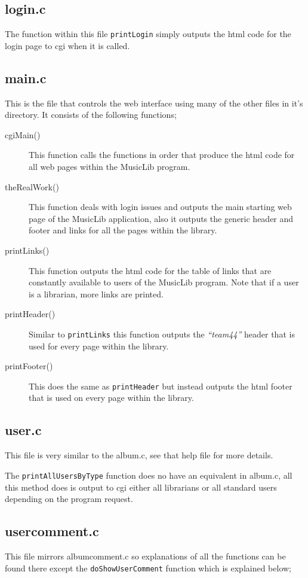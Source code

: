 \documentclass{article}
\begin{document}
\subsection{login.c}
The function within this file \verb|printLogin| simply outputs the html code for the login page to cgi when it is called.

\subsection{main.c}
This is the file that controls the web interface using many of the other files in it's directory. It consists of the following functions;
\begin{description}
\item[cgiMain()] This function calls the functions in order that produce the html code for all web pages within the MusicLib program.
\item[theRealWork()] This function deals with login issues and outputs the main starting web page of the MusicLib application, also it outputs the generic header and footer and links for all the pages within the library.
\item[printLinks()] This function outputs the html code for the table of links that are constantly available to users of the MusicLib program. Note that if a user is a librarian, more links are printed.
\item[printHeader()] Similar to \verb|printLinks| this function outputs the \emph{``team44''} header that is used for every page within the library.
\item[printFooter()] This does the same as \verb|printHeader| but instead outputs the html footer that is used on every page within the library.
\end{description}

\subsection{user.c}
This file is very similar to the album.c, see that help file for more details.

The \verb|printAllUsersByType| function does no have an equivalent in album.c, all this method does is output to cgi either all librarians or all standard users depending on the program request.
\subsection{usercomment.c}
This file mirrors albumcomment.c so explanations of all the functions can be found there except the \verb|doShowUserComment| function which is explained below;
\end{document}
